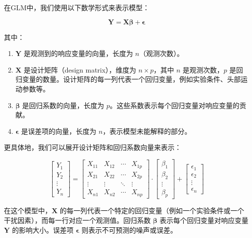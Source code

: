 \documentclass[bachelor, comfort]{shtthesis}
\begin{document}
在GLM中，我们使用以下数学形式来表示模型：

\[ \mathbf{Y} = \mathbf{X} \boldsymbol{\beta} + \boldsymbol{\epsilon} \]

其中：

\begin{enumerate}
	\item \(\mathbf{Y}\) 是观测到的响应变量的向量，长度为 \(n\)（观测次数）。
	\item \(\mathbf{X}\) 是设计矩阵（design matrix），维度为 \(n \times p\)，其中 \(n\) 是观测次数，\(p\) 是回归变量的数量。设计矩阵的每一列代表一个回归变量，例如实验条件、头部运动参数等。
	\item \(\boldsymbol{\beta}\) 是回归系数的向量，长度为 \(p\)。这些系数表示每个回归变量对响应变量的贡献。
	\item \(\boldsymbol{\epsilon}\) 是误差项的向量，长度为 \(n\)，表示模型未能解释的部分。
\end{enumerate}


更具体地，我们可以展开设计矩阵和回归系数向量来表示：

\[ \begin{bmatrix}
		Y_1    \\
		Y_2    \\
		\vdots \\
		Y_n
	\end{bmatrix} = \begin{bmatrix}
		X_{11} & X_{12} & \cdots & X_{1p} \\
		X_{21} & X_{22} & \cdots & X_{2p} \\
		\vdots & \vdots & \ddots & \vdots \\
		X_{n1} & X_{n2} & \cdots & X_{np}
	\end{bmatrix} \cdot \begin{bmatrix}
		\beta_1 \\
		\beta_2 \\
		\vdots  \\
		\beta_p
	\end{bmatrix} + \begin{bmatrix}
		\epsilon_1 \\
		\epsilon_2 \\
		\vdots     \\
		\epsilon_n
	\end{bmatrix} \]

在这个模型中，\(\mathbf{X}\) 的每一列代表一个特定的回归变量（例如一个实验条件或一个干扰因素），而每一行对应一个观测值。回归系数 \(\boldsymbol{\beta}\) 表示每个回归变量对响应变量 \(\mathbf{Y}\) 的影响大小。误差项 \(\boldsymbol{\epsilon}\) 则表示不可预测的噪声或误差。
\end{document}
